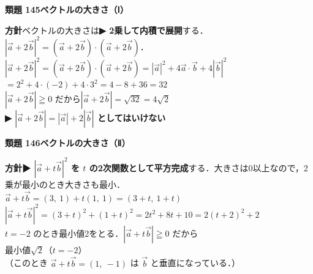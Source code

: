 \documentclass[a4paper,11pt]{ltjsarticle}
\newcommand{\ans}[2]{\Needspace{5\baselineskip}\vspace{6pt}%
  {\sffamily\bfseries 類題 #1\quad #2}\par}
\newcommand{\point}[1]{\textsf{\bfseries ▶ #1}}
\newcommand{\ax}[4]{\draw[->] (#1,0)--(#2,0) node[right]{\scriptsize $x$};
  \draw[->] (0,#3)--(0,#4) node[above]{\scriptsize $y$};
  \node[below left] at (0,0){\scriptsize O};}
\begin{document}
\ans{145}{ベクトルの大きさ（Ⅰ）}
\begin{kai}
\textbf{方針}\quad ベクトルの大きさは\point{2乗して内積で展開}する．$|\vec a+2\vec b|^2=(\vec a+2\vec b)\cdot(\vec a+2\vec b)$．\\[2pt]
$|\vec a+2\vec b|^2=(\vec a+2\vec b)\cdot(\vec a+2\vec b)=|\vec a|^2+4\vec a\cdot\vec b+4|\vec b|^2$\\
\hspace*{1.5em}$=2^2+4\cdot(-2)+4\cdot3^2=4-8+36=32$\\
$|\vec a+2\vec b|\geqq0$ だから\quad $|\vec a+2\vec b|=\sqrt{32}=4\sqrt2$\\
\point{$|\vec a+2\vec b|=|\vec a|+2|\vec b|$ としてはいけない}
\end{kai}

\ans{146}{ベクトルの大きさ（Ⅱ）}
\begin{kai}
\textbf{方針}\quad \point{$|\vec a+t\vec b|^2$ を $t$ の2次関数として平方完成}する．大きさは0以上なので，2乗が最小のとき大きさも最小．\\[2pt]
$\vec a+t\vec b=(3,\ 1)+t(1,\ 1)=(3+t,\ 1+t)$\\
$|\vec a+t\vec b|^2=(3+t)^2+(1+t)^2=2t^2+8t+10=2(t+2)^2+2$\\
$t=-2$ のとき最小値2をとる．$|\vec a+t\vec b|\geqq0$ だから\\[2pt]
最小値\quad $\sqrt2$\quad（$t=-2$）\\
（このとき $\vec a+t\vec b=(1,\ -1)$ は $\vec b$ と垂直になっている．）
\begin{center}
\end{center}
\end{kai}
\end{document}
